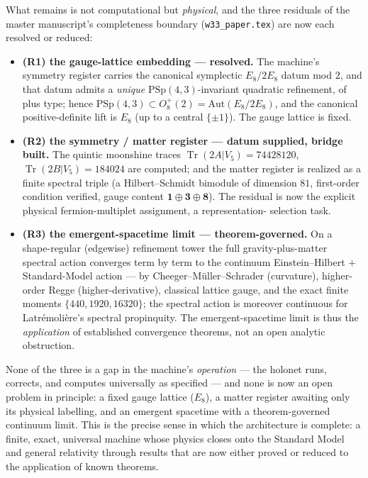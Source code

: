 \documentclass[11pt]{article}
\begin{document}
What remains is not computational but \emph{physical}, and the three residuals
of the master manuscript's completeness boundary (\texttt{w33\_paper.tex}) are
now each resolved or reduced:
\begin{itemize}
  \item \textbf{(R1) the gauge-lattice embedding --- resolved.} The machine's
        symmetry register carries the canonical symplectic $E_8/2E_8$ datum
        mod $2$, and that datum admits a \emph{unique}
        $\mathrm{PSp}(4,3)$-invariant quadratic refinement, of plus type;
        hence $\mathrm{PSp}(4,3)\subset O_8^+(2)=\mathrm{Aut}(E_8/2E_8)$, and
        the canonical positive-definite lift is $E_8$ (up to a central
        $\{\pm1\}$). The gauge lattice is fixed.
  \item \textbf{(R2) the symmetry / matter register --- datum supplied,
        bridge built.} The quintic moonshine traces
        $\operatorname{Tr}(2A|V_5)=74428120$, $\operatorname{Tr}(2B|V_5)
        =184024$ are computed; and the matter register is realized as a
        finite spectral triple (a Hilbert--Schmidt bimodule of dimension
        $81$, first-order condition verified, gauge content
        $\mathbf1\oplus\mathbf3\oplus\mathbf8$). The residual is now the
        explicit physical fermion-multiplet assignment, a representation-
        selection task.
  \item \textbf{(R3) the emergent-spacetime limit --- theorem-governed.} On a
        shape-regular (edgewise) refinement tower the full gravity-plus-matter
        spectral action converges term by term to the continuum
        Einstein--Hilbert $+$ Standard-Model action --- by
        Cheeger--M\"uller--Schrader (curvature), higher-order Regge
        (higher-derivative), classical lattice gauge, and the exact finite
        moments $\{440,1920,16320\}$; the spectral action is moreover
        continuous for Latr\'emoli\`ere's spectral propinquity. The
        emergent-spacetime limit is thus the \emph{application} of established
        convergence theorems, not an open analytic obstruction.
\end{itemize}
None of the three is a gap in the machine's \emph{operation} --- the holonet
runs, corrects, and computes universally as specified --- and none is now an
open problem in principle: a fixed gauge lattice ($E_8$), a matter register
awaiting only its physical labelling, and an emergent spacetime with a
theorem-governed continuum limit. This is the precise sense in which the
architecture is complete: a finite, exact, universal machine whose physics
closes onto the Standard Model and general relativity through results that are
now either proved or reduced to the application of known theorems.
\end{document}
